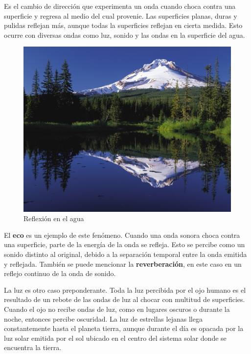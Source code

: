 Es el cambio de dirección que experimenta un onda cuando choca contra una superficie y regresa al medio del cual provenie. Las superficies planas, duras y  pulidas reflejan más, aunque todas la superficies reflejan en cierta medida. Esto ocurre con diversas ondas como luz, sonido y las ondas en la superficie del agua\cite{sncrfllight}.

\begin{figure}[H]
  \centering
  \includegraphics[scale=0.15]{imagenes/reflexion_monte.png}
  \caption{Reflexión en el agua\cite{wikireflexion}}
\end{figure}

El \textbf{eco} es un ejemplo de este fenómeno. Cuando una onda sonora choca contra una superficie, parte de la energía de la onda se refleja. Esto se percibe como un sonido distinto al original, debido a la separación temporal entre la onda emitida y reflejada. También se puede mencionar la \textbf{reverberación}, en este caso en un reflejo continuo de la onda de sonido.

La luz es otro caso preponderante. Toda la luz percibida por el ojo humano es el resultado de un rebote de las ondas de luz al chocar con multitud de superficies. Cuando el ojo no recibe ondas de luz, como en lugares oscuros o durante la noche, entonces percibe oscuridad. La luz de estrellas lejanas llega constantemente hasta el planeta tierra, aunque durante el día es opacada por la luz solar emitida por el sol ubicado en el centro del sistema solar donde se encuentra la tierra.
